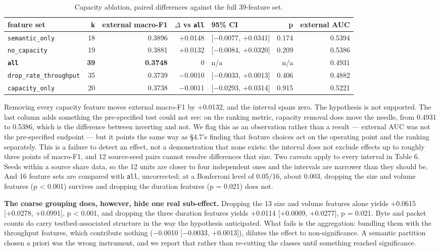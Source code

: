 \documentclass[preprint,12pt,nopreprintline]{elsarticle}
\begin{document}
\begin{table}[htbp]\centering\scriptsize
\caption{Capacity ablation, paired differences against the full 39-feature set.}
\begin{adjustbox}{max width=\textwidth}\begin{tabular}{lrrrlrr}
\toprule
feature set & k & external macro-F1 & $\Delta$ vs \texttt{all} & 95\% CI & p & external AUC \\
\midrule
\texttt{semantic\_only} & 18 & 0.3896 & +0.0148 & [$-$0.0077, +0.0341] & 0.174 & 0.5394 \\
\texttt{no\_capacity} & 19 & 0.3881 & +0.0132 & [$-$0.0084, +0.0320] & 0.209 & 0.5386 \\
\textbf{\texttt{all}} & \textbf{39} & \textbf{0.3748} & 0 & n/a & n/a & 0.4931 \\
\texttt{drop\_rate\_throughput} & 35 & 0.3739 & $-$0.0010 & [$-$0.0033, +0.0013] & 0.406 & 0.4882 \\
\texttt{capacity\_only} & 20 & 0.3738 & $-$0.0011 & [$-$0.0293, +0.0314] & 0.915 & 0.5221 \\
\bottomrule
\end{tabular}\end{adjustbox}
\end{table}

Removing every capacity feature moves external macro-F1 by +0.0132, and the interval spans zero. The hypothesis is not supported. The last column adds something the pre-specified test could not see: on the ranking metric, capacity removal does move the needle, from 0.4931 to 0.5386, which is the difference between inverting and not. We flag this as an observation rather than a result --- external AUC was not the pre-specified endpoint --- but it points the same way as \S{}4.7's finding that feature choices act on the operating point and the ranking separately. This is a failure to detect an effect, not a demonstration that none exists: the interval does not exclude effects up to roughly three points of macro-F1, and 12 source-seed pairs cannot resolve differences that size. Two caveats apply to every interval in Table 6. Seeds within a source share data, so the 12 units are closer to four independent ones and the intervals are narrower than they should be. And 16 feature sets are compared with \texttt{all}, uncorrected; at a Bonferroni level of 0.05/16, about 0.003, dropping the size and volume features (p < 0.001) survives and dropping the duration features (p = 0.021) does not.

\textbf{The coarse grouping does, however, hide one real sub-effect.} Dropping the 13 size and volume features alone yields +0.0615 [+0.0278, +0.0991], p < 0.001, and dropping the three duration features yields +0.0114 [+0.0009, +0.0277], p = 0.021. Byte and packet counts do carry testbed-associated structure in the way the hypothesis anticipated. What fails is the aggregation: bundling them with the throughput features, which contribute nothing ($-$0.0010 [$-$0.0033, +0.0013]), dilutes the effect to non-significance. A semantic partition chosen a priori was the wrong instrument, and we report that rather than re-cutting the classes until something reached significance.
\end{document}
